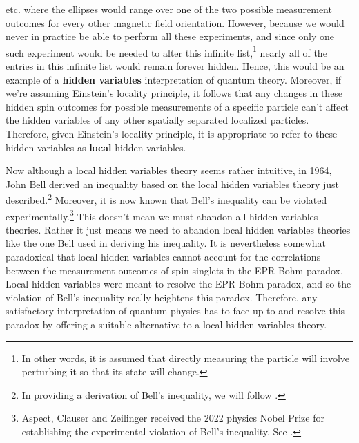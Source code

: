 \documentclass[12pt]{report}
\begin{document}
etc. where the ellipses would range over one of the two possible measurement outcomes for every other magnetic field orientation. However, because we would never in practice be able to perform all these experiments, and since only one such experiment would be needed to alter this infinite list,\footnote{In other words, it is assumed that directly measuring the particle will involve perturbing it so that its state will change.} nearly all of the entries in this infinite list would remain forever hidden. Hence, this would be an example of a \textbf{hidden variables} interpretation of quantum theory.  Moreover, if we're assuming Einstein's locality principle, it follows that any changes in these hidden spin outcomes for possible measurements of a specific particle can't affect the hidden variables of any other spatially separated localized particles. Therefore, given Einstein's locality principle, it is appropriate to refer to these hidden variables as \textbf{local} hidden variables.

Now although a local hidden variables theory seems rather intuitive, in 1964, John Bell derived an inequality based on the local hidden variables theory just described.\footnote{In providing a derivation of Bell's inequality, we will follow \cite[241-249]{Sakurai}.} Moreover, it is now known that Bell's inequality can be violated experimentally.\footnote{Aspect, Clauser and Zeilinger received the 2022 physics Nobel Prize for establishing the experimental violation of Bell's inequality. See \cite{Nobel2022}.} This doesn't mean we must abandon all hidden variables theories. Rather it just means we need to abandon local hidden variables theories like the one Bell used in deriving his inequality.  It is nevertheless somewhat paradoxical that local hidden variables cannot account for the correlations between the measurement outcomes of spin singlets in the EPR-Bohm paradox. Local hidden variables were meant to resolve the EPR-Bohm paradox, and so the violation of Bell's inequality really heightens this paradox. Therefore, any satisfactory interpretation of quantum physics has to face up to and resolve this paradox by offering a suitable alternative to a local hidden variables theory. 
\end{document}

